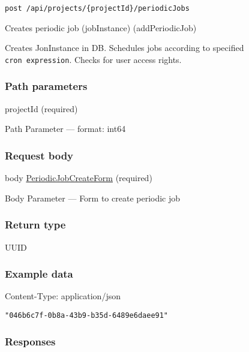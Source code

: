 \protect\hypertarget{addPeriodicJob}{}{}



\begin{verbatim}
post /api/projects/{projectId}/periodicJobs
\end{verbatim}

Creates periodic job (jobInstance) ({addPeriodicJob})

Creates JonInstance in DB. Schedules jobs according to specified
\texttt{cron\ expression}. Checks for user access rights.

\hypertarget{path-parameters-9}{%
\subsubsection*{Path parameters}\label{path-parameters-9}}

projectId (required)

{Path Parameter} --- format: int64

\hypertarget{request-body-3}{%
\subsubsection*{Request body}\label{request-body-3}}

body \protect\hyperlink{PeriodicJobCreateForm}{PeriodicJobCreateForm}
(required)

{Body Parameter} --- Form to create periodic job

\hypertarget{return-type-11}{%
\subsubsection*{Return type}\label{return-type-11}}

UUID

\hypertarget{example-data-11}{%
\subsubsection*{Example data}\label{example-data-11}}

Content-Type: application/json

\begin{verbatim}
"046b6c7f-0b8a-43b9-b35d-6489e6daee91"
\end{verbatim}

\hypertarget{responses-11}{%
\subsubsection*{Responses}\label{responses-11}}

